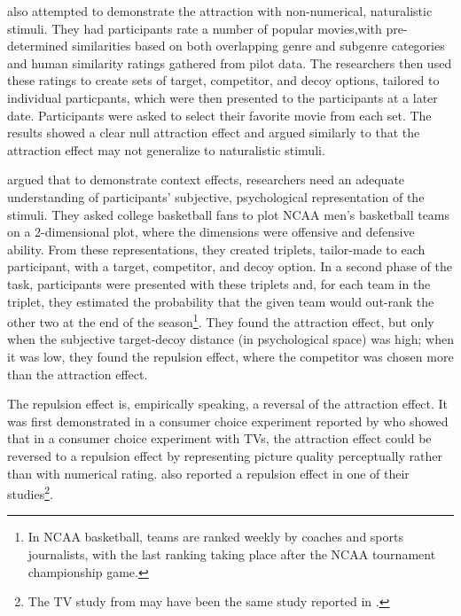 \textcite{trendlZeroAttractionEffect2021} also attempted to demonstrate the attraction with non-numerical, naturalistic stimuli. They had participants rate a number of popular movies,with pre-determined similarities based on both overlapping genre and subgenre categories and human similarity ratings gathered from pilot data. The researchers then used these ratings to create sets of target, competitor, and decoy options, tailored to individual particpants, which were then presented to the participants at a later date. Participants were asked to select their favorite movie from each set. The results showed a clear null attraction effect and \textcite{trendlZeroAttractionEffect2021} argued similarly to \textcite{frederickLimitsAttraction2014b} that the attraction effect may not generalize to naturalistic stimuli.

\textcite{fang2024context} argued that to demonstrate context effects, researchers need an adequate understanding of participants' subjective, psychological representation of the stimuli. They asked college basketball fans to plot NCAA men's basketball teams on a 2-dimensional plot, where the dimensions were offensive and defensive ability. From these representations, they created triplets, tailor-made to each participant, with a target, competitor, and decoy option. In a second phase of the task, participants were presented with these triplets and, for each team in the triplet, they estimated the probability that the given team would out-rank the other two at the end of the season\footnote{In NCAA basketball, teams are ranked weekly by coaches and sports journalists, with the last ranking taking place after the NCAA tournament championship game.}. They found the attraction effect, but only when the subjective target-decoy distance (in psychological space) was high; when it was low, they found the repulsion effect, where the competitor was chosen more than the attraction effect.

The repulsion effect is, empirically speaking, a reversal of the attraction effect. It was first demonstrated in a consumer choice experiment reported by \textcite{frederick2008attraction} who showed that in a consumer choice experiment with TVs, the attraction effect could be reversed to a repulsion effect by representing picture quality perceptually rather than with numerical rating. \textcite{frederickLimitsAttraction2014b} also reported a repulsion effect in one of their studies\footnote{The TV study from \textcite{frederick2008attraction} may have been the same study reported in \textcite{frederickLimitsAttraction2014b}.}. 

